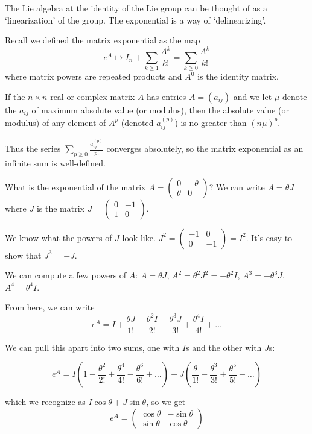 The Lie algebra at the identity of the Lie group can be thought of as a `linearization' of the group.  The exponential is a way of `delinearizing'.

Recall we defined the matrix exponential as the map $$e^A\mapsto I_n+\sum\limits_{k\geq 1}\frac{A^k}{k!} = \sum\limits_{k\geq 0}\frac{A^k}{k!}$$ where matrix powers are repeated products and $A^0$ is the identity matrix.

\begin{lemma}
	If the $n\times n$ real or complex matrix $A$ has entries $A=(a_{ij})$ and we let $\mu$ denote the $a_{ij}$ of maximum absolute value (or modulus), then the absolute value (or modulus) of any element of $A^p$ (denoted $a_{ij}^{(p)}$) is no greater than $(n\mu)^p$. 
	
	Thus the series $\sum\limits_{p\geq 0}\frac{a_{ij}^{(p)}}{p!}$ converges absolutely, so the matrix exponential as an infinite sum is well-defined.
\end{lemma}


What is the exponential of the matrix $A=\begin{pmatrix}
0&-\theta\\\theta&0\end{pmatrix}$?
We can write $A=\theta J$ where $J$ is the matrix $J=\begin{pmatrix}0&-1\\1&0\end{pmatrix}$.

We know what the powers of $J$ look like.  $J^2=\begin{pmatrix}
-1&0\\0&-1\end{pmatrix} = I^2$.  It's easy to show that $J^3=-J$.


We can compute a few powers of $A$: $A=\theta J$, $A^2=\theta^2J^2=-\theta^2I$, $A^3=-\theta^3 J$, $A^4=\theta^4 I$.

From here, we can write $$e^A = I+\frac{\theta J}{1!} -\frac{\theta^2 I}{2!} - \frac{\theta^3 J}{3!} + \frac{\theta^4 I}{4!} + \dots$$

We can pull this apart into two sums, one with $I$s and the other with $J$s:

$$e^A = I\left(1-\frac{\theta^2}{2!} + \frac{\theta^4}{4!} - \frac{\theta^6}{6!} + \dots \right) + J\left(   \frac{\theta}{1!}   - \frac{\theta^3}{3!} + \frac{\theta^5}{5!} - \dots     \right)$$

which we recognize as $I\cos\theta + J\sin\theta$, so we get $$e^A=\begin{pmatrix}
\cos\theta&-\sin\theta\\\sin\theta&\cos\theta\end{pmatrix}$$

